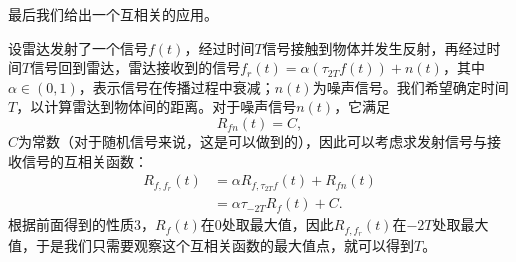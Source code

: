最后我们给出一个互相关的应用\cite{brad_osgood_ee261}。
\begin{example}[雷达测距]
    设雷达发射了一个信号$f(t)$，经过时间$T$信号接触到物体并发生反射，再经过时间$T$信号回到雷达，雷达接收到的信号$f_r(t)=\alpha (\tau_{2T}f(t))+n(t)$，其中$\alpha\in(0,1)$，表示信号在传播过程中衰减；$n(t)$为噪声信号。我们希望确定时间$T$，以计算雷达到物体间的距离。对于噪声信号$n(t)$，它满足
    \begin{equation}
        R_{fn}(t)=C,
    \end{equation}
    $C$为常数（对于随机信号来说，这是可以做到的），因此可以考虑求发射信号与接收信号的互相关函数：
    \begin{align}
        R_{f,f_r}(t) & =\alpha R_{f,\tau_{2T}f}(t)+R_{fn}(t)\nonumber  \\
                     & =\alpha\tau_{-2T}R_f(t)+C.
    \end{align}
    根据前面得到的性质3，$R_f(t)$在0处取最大值，因此$R_{f,f_r}(t)$在$-2T$处取最大值，于是我们只需要观察这个互相关函数的最大值点，就可以得到$T$。
\end{example}
